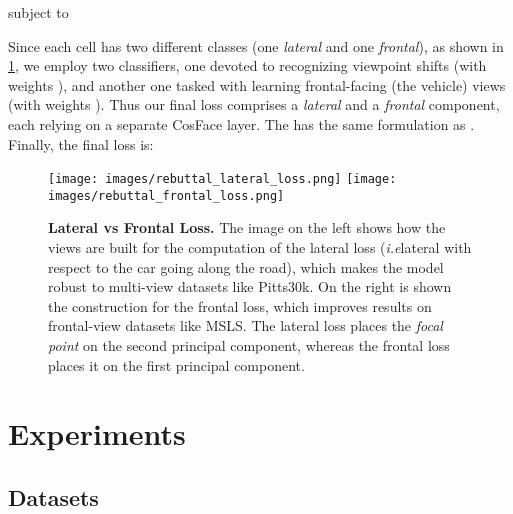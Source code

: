 \documentclass[10pt,twocolumn,letterpaper]{article}
\def\ie{\emph{i.e}\onedot}
\begin{document}
subject to 
 


Since each cell has two different classes (one \textit{lateral} and one \textit{frontal}), as shown in \cref{fig:frontal_lateral_loss}, we employ two classifiers, one devoted to recognizing viewpoint shifts (with weights ), and another one tasked with learning frontal-facing (\wrt the vehicle) views (with weights ).
Thus our final loss comprises a \textit{lateral} and a \textit{frontal} component, each relying on a separate CosFace layer. The  has the same formulation as . 
Finally, the final loss is:



\begin{figure}
    \begin{center}
    \texttt{[image: images/rebuttal\_lateral\_loss.png]}
    \texttt{[image: images/rebuttal\_frontal\_loss.png]}
    \end{center}
    \caption{
    \textbf{Lateral vs Frontal Loss.} The image on the left shows how the views are built for the computation of the lateral loss (\ie lateral with respect to the car going along the road), which makes the model robust to multi-view datasets like Pitts30k. On the right is shown the construction for the frontal loss, which improves results on frontal-view datasets like MSLS.
    The lateral loss places the \emph{focal point} on the second principal component, whereas the frontal loss places it on the first principal component.
    }
    \label{fig:frontal_lateral_loss}
\end{figure}
  
\section{Experiments}
\label{sec:experiments}



\subsection{Datasets}
\end{document}
